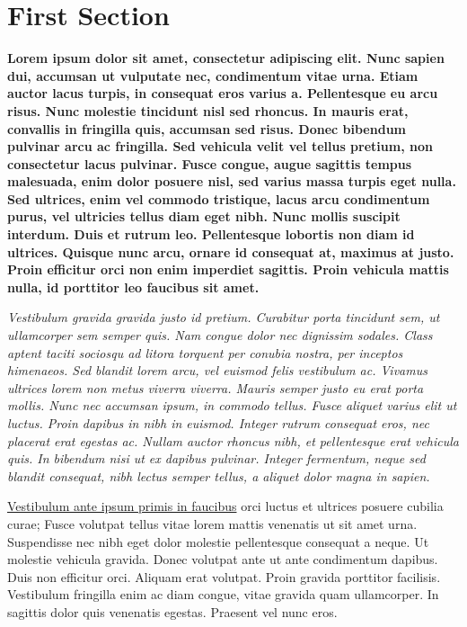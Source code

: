 \documentclass{report}
\begin{document}
	\section{First Section}
	
	\textbf{Lorem ipsum dolor sit amet, consectetur adipiscing elit. Nunc sapien dui, accumsan ut vulputate nec, condimentum vitae urna. Etiam auctor lacus turpis, in consequat eros varius a. Pellentesque eu arcu risus. Nunc molestie tincidunt nisl sed rhoncus. In mauris erat, convallis in fringilla quis, accumsan sed risus. Donec bibendum pulvinar arcu ac fringilla. Sed vehicula velit vel tellus pretium, non consectetur lacus pulvinar. Fusce congue, augue sagittis tempus malesuada, enim dolor posuere nisl, sed varius massa turpis eget nulla. Sed ultrices, enim vel commodo tristique, lacus arcu condimentum purus, vel ultricies tellus diam eget nibh. Nunc mollis suscipit interdum. Duis et rutrum leo. Pellentesque lobortis non diam id ultrices. Quisque nunc arcu, ornare id consequat at, maximus at justo. Proin efficitur orci non enim imperdiet sagittis. Proin vehicula mattis nulla, id porttitor leo faucibus sit amet.}
	
	\textit{Vestibulum gravida gravida justo id pretium. Curabitur porta tincidunt sem, ut ullamcorper sem semper quis. Nam congue dolor nec dignissim sodales. Class aptent taciti sociosqu ad litora torquent per conubia nostra, per inceptos himenaeos. Sed blandit lorem arcu, vel euismod felis vestibulum ac. Vivamus ultrices lorem non metus viverra viverra. Mauris semper justo eu erat porta mollis. Nunc nec accumsan ipsum, in commodo tellus. Fusce aliquet varius elit ut luctus. Proin dapibus in nibh in euismod. Integer rutrum consequat eros, nec placerat erat egestas ac. Nullam auctor rhoncus nibh, et pellentesque erat vehicula quis. In bibendum nisi ut ex dapibus pulvinar. Integer fermentum, neque sed blandit consequat, nibh lectus semper tellus, a aliquet dolor magna in sapien.}
	
	\underline{Vestibulum ante ipsum primis in faucibus} orci luctus et ultrices posuere cubilia curae; Fusce volutpat tellus vitae lorem mattis venenatis ut sit amet urna. Suspendisse nec nibh eget dolor molestie pellentesque consequat a neque. Ut molestie vehicula gravida. Donec volutpat ante ut ante condimentum dapibus. Duis non efficitur orci. Aliquam erat volutpat. Proin gravida porttitor facilisis. Vestibulum fringilla enim ac diam congue, vitae gravida quam ullamcorper. In sagittis dolor quis venenatis egestas. Praesent vel nunc eros.
	
\end{document}

